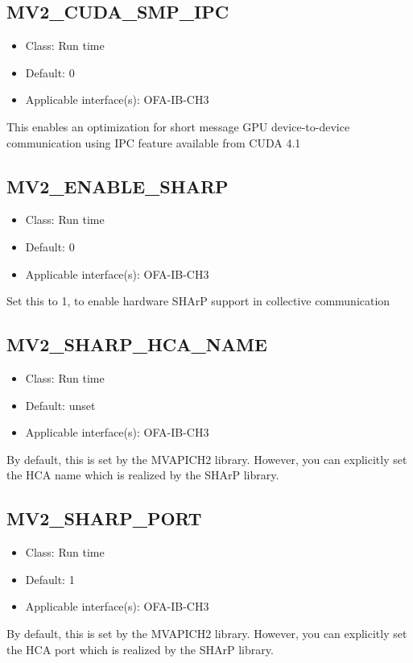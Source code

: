 \subsection{MV2\_CUDA\_SMP\_IPC}
\label{def:cuda-ipc}

\begin{itemize}
        \item Class: Run time
        \item Default: 0
        \item Applicable interface(s): OFA-IB-CH3
\end{itemize}
This enables an optimization for short message GPU device-to-device communication using IPC feature available from CUDA 4.1

\subsection{MV2\_ENABLE\_SHARP}
\label{def:enable-sharp}
\begin{itemize}
        \item Class: Run time
        \item Default: 0
        \item Applicable interface(s): OFA-IB-CH3
\end{itemize}
Set this to 1, to enable hardware SHArP support in collective communication

\subsection{MV2\_SHARP\_HCA\_NAME}
\label{def:sharp-hca-name}
\begin{itemize}
        \item Class: Run time
        \item Default: unset
        \item Applicable interface(s): OFA-IB-CH3
\end{itemize}
By default, this is set by the MVAPICH2 library. However, you can explicitly
set the HCA name which is realized by the SHArP library. 

\subsection{MV2\_SHARP\_PORT}
\label{def:sharp-port}
\begin{itemize}
        \item Class: Run time
        \item Default: 1
        \item Applicable interface(s): OFA-IB-CH3
\end{itemize}
By default, this is set by the MVAPICH2 library. However, you can explicitly
set the HCA port which is realized by the SHArP library. 

